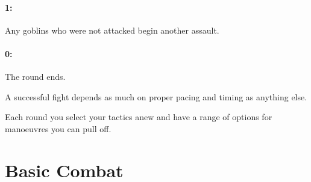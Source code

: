\begin{multicols}{2}
\paragraph{1:} Any goblins who were not attacked begin another assault.
\paragraph{0:} The round ends.

A successful fight depends as much on proper pacing and timing as anything else.

Each \gls{round} you select your tactics anew and have a range of options for manoeuvres you can pull off.

\end{multicols}

\section{Basic Combat}

